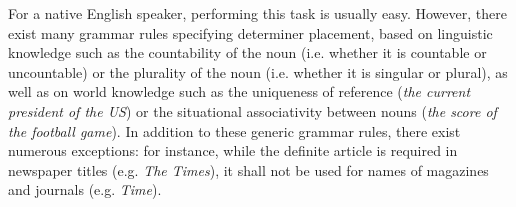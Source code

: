 \documentclass[justified, marginals=justified]{tufte-handout}
\begin{document}




For a native English speaker, performing this task is usually easy. However, there exist many grammar rules specifying determiner placement, based on linguistic knowledge such as the countability of the noun (i.e. whether it is countable or uncountable) or the plurality of the noun (i.e. whether it is singular or plural), as well as on world knowledge such as the uniqueness of reference (\textit{the current president of the US}) or the situational associativity between nouns (\textit{the score of the football game}). In addition to these generic grammar rules, there exist numerous exceptions: for instance, while the definite article is required in newspaper titles (e.g. \textit{The Times}), it shall not be used for names of magazines and journals (e.g. \textit{Time}). %

\end{document}
